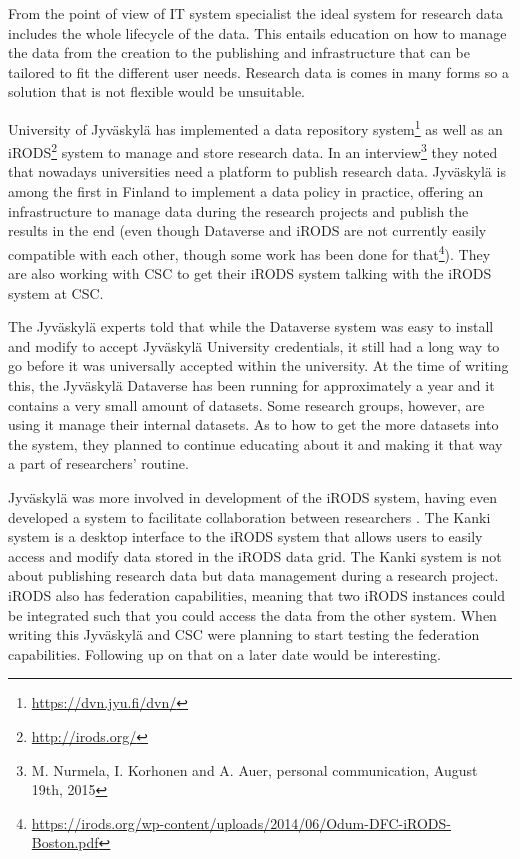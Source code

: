 From the point of view of IT system specialist the ideal system for research
data includes the whole lifecycle of the data. This entails education on how
to manage the data from the creation to the publishing and infrastructure that
can be tailored to fit the different user needs. Research data is comes in
many forms so a solution that is not flexible would be unsuitable.

University of Jyväskylä has implemented a data repository system\footnote{\url{https://dvn.jyu.fi/dvn/}}
as well as an iRODS\footnote{\url{http://irods.org/}} system to manage and
store research data. In an interview\footnote{M. Nurmela, I. Korhonen and A.
Auer, personal communication, August 19th, 2015} they noted that nowadays
universities need a platform to publish research data. Jyväskylä is among the
first in Finland to implement a data policy in practice, offering an
infrastructure to manage data during the research projects and publish the
results in the end (even though Dataverse and iRODS are not currently
easily compatible with each other, though some work has been done for
that\footnote{\url{https://irods.org/wp-content/uploads/2014/06/Odum-DFC-iRODS-Boston.pdf}}).
They are also working with CSC to get their iRODS system talking with the iRODS
system at CSC.

The Jyväskylä experts told that while the Dataverse system was easy to install
and modify to accept Jyväskylä University credentials, it still had a long way to go
before it was universally accepted within the university. At the time of
writing this, the Jyväskylä Dataverse has been running for approximately a
year and it contains a very small amount of datasets. Some research groups,
however, are using it manage their internal datasets. As to how to get the
more datasets into the system, they planned to continue educating about it
and making it that way a part of researchers' routine.

Jyväskylä was more involved in development of the iRODS system, having even
developed a system to facilitate collaboration between researchers
\cite{irodsinproceedings}. The Kanki system is a desktop interface to the iRODS
system that allows users to easily access and modify data stored in the iRODS
data grid. The Kanki system is not about publishing research data but data
management during a research project. iRODS also has federation capabilities,
meaning that two iRODS instances could be integrated such that you could
access the data from the other system. When writing this Jyväskylä and CSC
were planning to start testing the federation capabilities. Following up on that
on a later date would be interesting.

